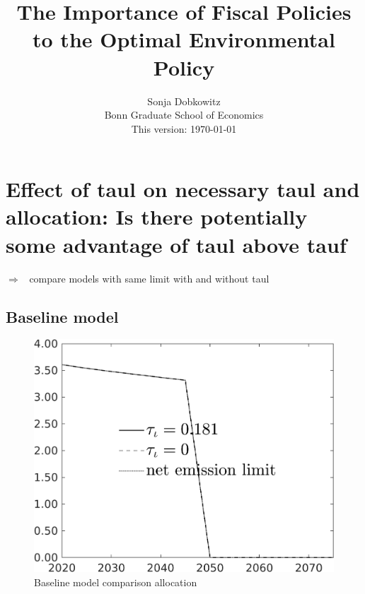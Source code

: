 \documentclass[12pt]{article}
\title{The Importance of Fiscal Policies to the Optimal Environmental Policy}
\date{Sonja Dobkowitz\\ Bonn Graduate School of Economics\\ %
	\vspace{1mm}
	This version: \today }
\newcommand{\ar}{$\Rightarrow$ \ }
\begin{document}
\section{Effect of taul on necessary taul and allocation: Is there potentially some advantage of taul above tauf}

\ar compare models with same limit with and without taul
\subsection{Baseline model}
\begin{figure}[h!!]
	\centering
	\caption{Baseline model comparison allocation}\label{fig:Leveltauf_nsk0_xgr0_notaul}
	\begin{minipage}[]{0.32\textwidth}
		\includegraphics[width=1\textwidth]{../../codding_model/own_basedOnFried/optimalPol_010922_revision/figures/all_13Sept22/CompTauf_bytaul_Reg0_Emnet_spillover0_nsk0_xgr0_knspil0_sep0_LFlimit1_emsbase0_countec0_GovRev0_etaa0.79_lgd1.png}
\end{minipage}		
\begin{minipage}[]{0.32\textwidth}

\end{minipage}
\end{figure}
\end{document}
